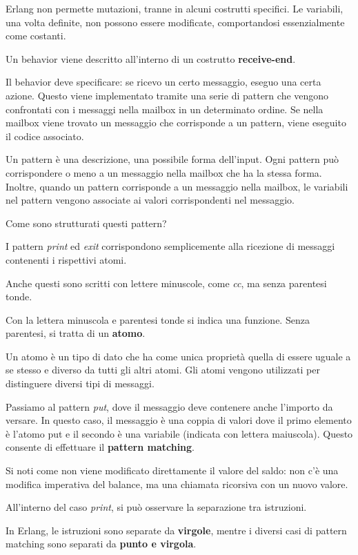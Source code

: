 \documentclass{article}
\begin{document}
Erlang non permette mutazioni, tranne in alcuni costrutti specifici. Le variabili, una volta definite, non possono essere modificate, comportandosi essenzialmente come costanti.

Un behavior viene descritto all'interno di un costrutto \textbf{receive-end}.

Il behavior deve specificare: se ricevo un certo messaggio, eseguo una certa azione. Questo viene implementato tramite una serie di pattern che vengono confrontati con i messaggi nella mailbox in un determinato ordine. Se nella mailbox viene trovato un messaggio che corrisponde a un pattern, viene eseguito il codice associato.

Un pattern è una descrizione, una possibile forma dell'input. Ogni pattern può corrispondere o meno a un messaggio nella mailbox che ha la stessa forma. Inoltre, quando un pattern corrisponde a un messaggio nella mailbox, le variabili nel pattern vengono associate ai valori corrispondenti nel messaggio.

Come sono strutturati questi pattern? 

I pattern \textit{print} ed \textit{exit} corrispondono semplicemente alla ricezione di messaggi contenenti i rispettivi atomi.

Anche questi sono scritti con lettere minuscole, come \textit{cc}, ma senza parentesi tonde.

Con la lettera minuscola e parentesi tonde si indica una funzione. Senza parentesi, si tratta di un \textbf{atomo}.

Un atomo è un tipo di dato che ha come unica proprietà quella di essere uguale a se stesso e diverso da tutti gli altri atomi. Gli atomi vengono utilizzati per distinguere diversi tipi di messaggi.

Passiamo al pattern \textit{put}, dove il messaggio deve contenere anche l'importo da versare. In questo caso, il messaggio è una coppia di valori dove il primo elemento è l'atomo put e il secondo è una variabile (indicata con lettera maiuscola). Questo consente di effettuare il \textbf{pattern matching}.

Si noti come non viene modificato direttamente il valore del saldo: non c'è una modifica imperativa del balance, ma una chiamata ricorsiva con un nuovo valore.

All'interno del caso \textit{print}, si può osservare la separazione tra istruzioni.

In Erlang, le istruzioni sono separate da \textbf{virgole}, mentre i diversi casi di pattern matching sono separati da \textbf{punto e virgola}.
\end{document}
